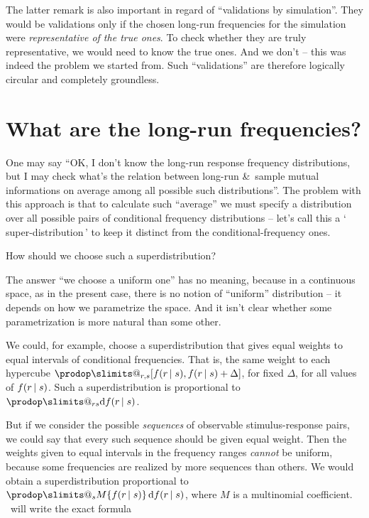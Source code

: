 \documentclass[\ifafour a4paper,12pt,\else a5paper,10pt,\fi%
onecolumn,oneside,article,%
british%
]{memoir}
\makeatletter
\newcommand*{\defquote}[1]{`\,#1\,'}
\theoremstyle{remark}
\theoremstyle{innote}
\def\prod{\DOTSI\prodop\slimits@}
\newcommand*{\amp}{\&}
\newcommand*{\di}{\mathrm{d}}%
\DeclarePairedDelimiter\clcl{[}{]}
\renewcommand*{\|}[1][]{\nonscript\,#1\vert\nonscript\;\mathopen{}}
\renewcommand*{\=}{\TextOrMath\texteq\eq}
\newcommand*{\puzzle}{{\fontencoding{U}\fontfamily{fontawesometwo}\selectfont\symbol{225}}}
\newcommand{\mynote}[1]{ {\color{notecolour}\puzzle\ #1}}
\makeatother
\begin{document}
The latter remark is also important in regard of \enquote{validations by
  simulation}. They would be validations only if the chosen long-run
frequencies for the simulation were \emph{representative of the true ones}.
To check whether they are truly representative, we would need to know the
true ones. And we don't -- this was indeed the problem we started from.
Such \enquote{validations} are therefore logically circular and completely
groundless.

\section{What are the long-run frequencies?}
\label{sec:longrun_freqs}


One may say \enquote{OK, I don't know the long-run response frequency
  distributions, but I may check what's the relation between long-run \amp\
  sample mutual informations on average among all possible such
  distributions}. The problem with this approach is that to calculate such
\enquote{average} we must specify a distribution over all possible pairs of
conditional frequency distributions -- let's call this a
\defquote{super-distribution} to keep it distinct from the
conditional-frequency ones.

How should we choose such a superdistribution?

The answer \enquote{we choose a uniform one} has no meaning, because in a
continuous space, as in the present case, there is no notion of
\enquote{uniform} distribution -- it depends on how we parametrize the
space. And it isn't clear whether some parametrization is more natural than
some other.

We could, for example, choose a superdistribution that gives equal weights
to equal intervals of conditional frequencies. That is, the same weight to
each hypercube $\prod_{r,s}\clcl{f(r \|s), f(r \|s) + \Delta}$, for fixed
$\Delta$, for all values of $f(r \|s)$. Such a superdistribution is
proportional to $\prod_{rs}\di f(r \|s)$.

But if we consider the possible \emph{sequences} of observable
stimulus-response pairs, we could say that every such sequence should be
given equal weight. Then the weights given to equal intervals in the
frequency ranges \emph{cannot} be uniform, because some frequencies are
realized by more sequences than others. We would obtain a superdistribution
proportional to $\prod_{s} M\{f(r \|s)\}\,\di f(r \|s)$, where $M$ is a
multinomial coefficient. \mynote{will write the exact formula}
\end{document}
